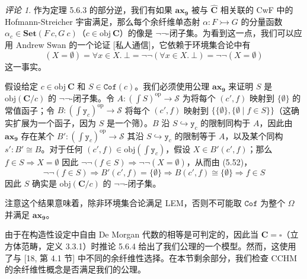 \documentclass{ctexrep}
\theoremstyle{plain}
\theoremstyle{definition}
\theoremstyle{remark}
\newtheorem{remark}[theorem]{评论}
\newcommand{\ax}[1]{\mathbf{ax_{#1}}}
\begin{document}
\begin{remark}
作为定理 5.6.3 的部分逆，我们有如果 $\ax{9}$ 被与 $\widehat{\mathbf{C}}$ 相关联的 CwF 中的 Hofmann-Streicher 宇宙满足，那么每个余纤维单态射 $\alpha : F \rightarrowtail G$ 的分量函数 $\alpha_c \in \mathbf{Set}(F\ c, G\ c)$（$c \in \mathrm{obj}\ \mathbf{C}$）的像是 $\neg\neg$-闭子集。为看到这一点，我们可以应用 Andrew Swan 的一个论证 [私人通信]，它依赖于环境集合论中有
\begin{equation}
(X = \emptyset) = \forall x \in X.\ \bot = \neg\neg(\forall x \in X.\ \bot) = \neg\neg(X = \emptyset)
\end{equation}
这一事实。

假设给定 $c \in \mathrm{obj}\ \mathbf{C}$ 和 $S \in \mathtt{Cof}(c)$。我们必须使用公理 $\ax{9}$ 来证明 $S$ 是 $\mathrm{obj}(\mathbf{C}/c)$ 的 $\neg\neg$-闭子集。令 $A : (\int S)^{\mathrm{op}} \to \mathcal{S}$ 为将每个 $(c', f)$ 映射到 $\{\emptyset\}$ 的常值函子；令 $B : (\int \mathtt{y}_c)^{\mathrm{op}} \to \mathcal{S}$ 将每个 $(c', f)$ 映射到 $\{\{\emptyset\}, \{\emptyset \mid f \in S\}\}$（这确实扩展为一个函子，因为 $S$ 是一个筛）。$B$ 沿 $S \hookrightarrow \mathtt{y}_c$ 的限制同构于 $A$，因此由 $\ax{9}$ 存在某个 $B' : (\int \mathtt{y}_c)^{\mathrm{op}} \to \mathcal{S}$ 其沿 $S \hookrightarrow \mathtt{y}_c$ 的限制等于 $A$，以及某个同构 $s' : B' \cong B$。对于任何 $(c', f) \in \mathrm{obj}(\int \mathtt{y}_c)$，假设 $X \in B'(c', f)$；那么 $f \in S \Rightarrow X = \emptyset$ 因此 $\neg\neg(f \in S) \Rightarrow \neg\neg(X = \emptyset)$，从而由 (5.52)，
\[
\neg\neg(f \in S) \Rightarrow B'(c', f) = \{\emptyset\} \Rightarrow B(c', f) \cong \{\emptyset\} \Rightarrow f \in S
\]
因此 $S$ 确实是 $\mathrm{obj}(\mathbf{C}/c)$ 的 $\neg\neg$-闭子集。

注意这个结果意味着，除非环境集合论满足 LEM，否则不可能取 $\mathtt{Cof}$ 为整个 $\Omega$ 并满足 $\ax{9}$。
\end{remark}

由于在构造性设定中自由 De Morgan 代数的相等是可判定的，因此当 $\mathbf{C} = \square$（立方体范畴，定义 3.3.1）时推论 5.6.4 给出了我们公理的一个模型。然而，这使用了与 [18, 第 4.1 节] 中不同的余纤维性选择。在本节剩余部分，我们检查 CCHM 的余纤维性概念是否满足我们的公理。
\end{document}
